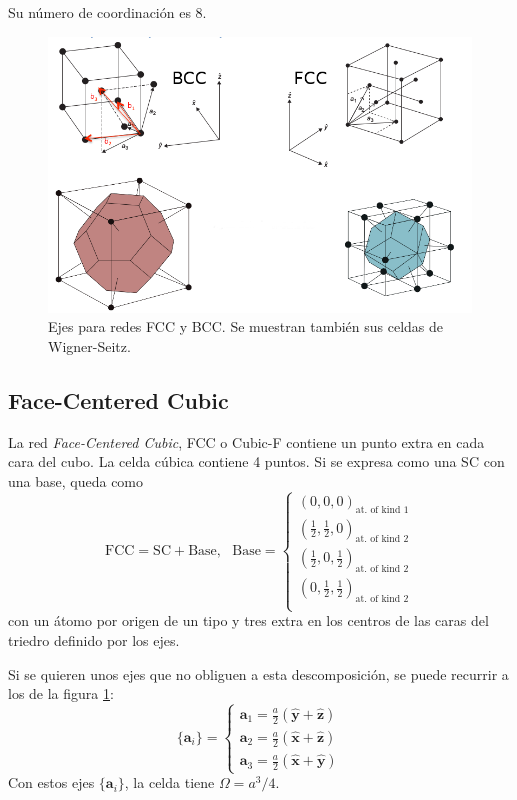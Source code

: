 Su número de coordinación es 8.
\begin{figure}
  \centering
  \includegraphics[width=\textwidth]{figures/cubeaxis.png}
  \caption{Ejes para redes FCC y BCC. Se muestran también sus celdas
    de Wigner-Seitz.}
  \label{fig:cubeaxis}
\end{figure}

\subsection{Face-Centered Cubic}
La red \emph{Face-Centered Cubic}, FCC o Cubic-F contiene un
  punto extra en cada cara del cubo. La celda cúbica contiene 4
  puntos. Si se expresa como una SC con una base, queda como
\begin{equation}
  \text{FCC} = \text{SC} + \text{Base},\ \ \ \text{Base} =
  \begin{cases}
    (0,0,0)_{\text{at. of kind 1}} \\
    (\frac{1}{2},\frac{1}{2},0)_{\text{at. of kind 2}} \\
    (\frac{1}{2},0,\frac{1}{2})_{\text{at. of kind 2}} \\
    (0,\frac{1}{2},\frac{1}{2})_{\text{at. of kind 2}} \\
  \end{cases}
\end{equation}
con un átomo por origen de un tipo y tres extra en los centros de las
caras del triedro definido por los ejes. 

Si se quieren unos ejes que no obliguen a esta descomposición, se
puede recurrir a los de la figura \ref{fig:cubeaxis}:
\begin{equation}
  \{\mathbf{a}_i\} =
  \begin{cases}
     \mathbf{a}_1 = \frac{a}{2} ( \hat{ \mathbf{y}} + \hat{ \mathbf{z}} )  \\
      \mathbf{a}_2 = \frac{a}{2} (\hat {\mathbf{x} }+ \hat {\mathbf{z} })   \\
      \mathbf{a}_3 = \frac{a}{2} (\hat {\mathbf{x}} + \hat {\mathbf{y} }) 
  \end{cases}
\end{equation}
Con estos ejes $\{\mathbf{a}_i\}$, la celda tiene $\Omega = a^3/4$.

